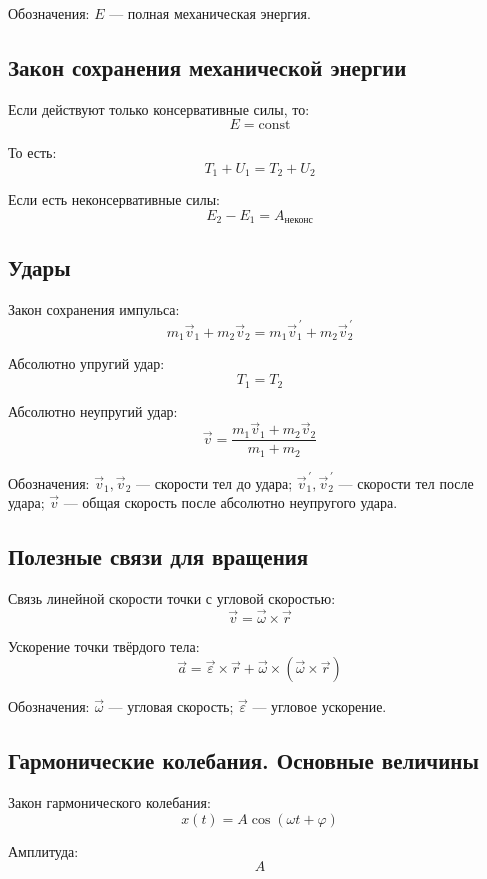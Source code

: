\documentclass[a4paper,12pt]{article}
\begin{document}
Обозначения:  
\(E\) — полная механическая энергия.

\subsection{Закон сохранения механической энергии}

Если действуют только консервативные силы, то:
\[
E = \text{const}
\]

То есть:
\[
T_1 + U_1 = T_2 + U_2
\]

Если есть неконсервативные силы:
\[
E_2 - E_1 = A_{\text{неконс}}
\]

\subsection{Удары}

Закон сохранения импульса:
\[
m_1 \vec v_1 + m_2 \vec v_2 = m_1 \vec v_1^{\, \prime} + m_2 \vec v_2^{\, \prime}
\]

Абсолютно упругий удар:
\[
T_1 = T_2
\]

Абсолютно неупругий удар:
\[
\vec v = \frac{m_1 \vec v_1 + m_2 \vec v_2}{m_1 + m_2}
\]

Обозначения:  
\(\vec v_1, \vec v_2\) — скорости тел до удара;  
\(\vec v_1^{\, \prime}, \vec v_2^{\, \prime}\) — скорости тел после удара;  
\(\vec v\) — общая скорость после абсолютно неупругого удара.

\subsection{Полезные связи для вращения}

Связь линейной скорости точки с угловой скоростью:
\[
\vec v = \vec \omega \times \vec r
\]

Ускорение точки твёрдого тела:
\[
\vec a = \vec \varepsilon \times \vec r + \vec \omega \times \left( \vec \omega \times \vec r \right)
\]

Обозначения:  
\(\vec \omega\) — угловая скорость;  
\(\vec \varepsilon\) — угловое ускорение.

\subsection{Гармонические колебания. Основные величины}

Закон гармонического колебания:
\[
x\left(t\right) = A \cos\left(\omega t + \varphi\right)
\]

Амплитуда:
\[
A
\]
\end{document}
